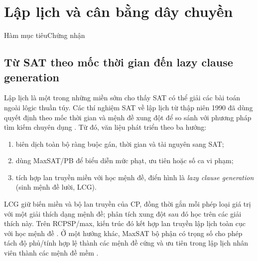 \chapter{Lập lịch và cân bằng dây chuyền}


  {Hàm mục tiêu}{Chứng nhận}

\section{Từ SAT theo mốc thời gian đến lazy clause generation}

Lập lịch là một trong những miền sớm cho thấy SAT có thể giải các bài toán
ngoài lôgic thuần túy. Các thí nghiệm SAT về lập lịch từ thập niên 1990 đã
dùng quyết định theo mốc thời gian và mệnh đề xung đột để so sánh với phương
pháp tìm kiếm chuyên dụng \parencite{crawford1994scheduling}. Từ đó, văn liệu
phát triển theo ba hướng:
\begin{enumerate}
  \item biên dịch toàn bộ ràng buộc gán, thời gian và tài nguyên sang SAT;
  \item dùng MaxSAT/PB để biểu diễn mức phạt, ưu tiên hoặc số ca vi phạm;
  \item tích hợp lan truyền miền với học mệnh đề, điển hình là
        \emph{lazy clause generation} (sinh mệnh đề lười, LCG).
\end{enumerate}

LCG giữ biến miền và bộ lan truyền của CP, đồng thời gắn mỗi phép loại giá trị
với một giải thích dạng mệnh đề; phân tích xung đột sau đó học trên các giải
thích này. Trên RCPSP/max, kiến trúc đó kết hợp lan truyền lập lịch toàn cục
với học mệnh đề \parencite{schutt2013lcg}. Ở một hướng khác, MaxSAT bộ phận có
trọng số cho phép tách độ phủ/tính hợp lệ thành các mệnh đề cứng và ưu tiên
trong lập lịch nhân viên thành các mệnh đề mềm
\parencite{demirovic2019staff}.

